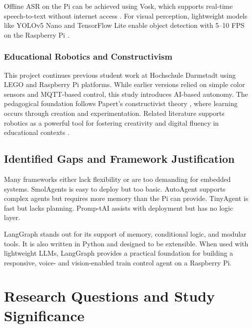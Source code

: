 Offline ASR on the Pi can be achieved using Vosk, which supports real-time speech-to-text without internet access \cite{vosk2023api}. For visual perception, lightweight models like YOLOv5 Nano and TensorFlow Lite enable object detection with 5–10 FPS on the Raspberry Pi \cite{lin2022realtime, tan2023lightweightcv}.


\subsubsection{Educational Robotics and Constructivism}

This project continues previous student work at Hochschule Darmstadt using LEGO and Raspberry Pi platforms. While earlier versions relied on simple color sensors and MQTT-based control, this study introduces AI-based autonomy. The pedagogical foundation follows Papert's constructivist theory \cite{papert1980mindstorms}, where learning occurs through creation and experimentation. Related literature supports robotics as a powerful tool for fostering creativity and digital fluency in educational contexts \cite{resnick2009kindergarten,bers2020coding}.

\subsection{Identified Gaps and Framework Justification}

Many frameworks either lack flexibility or are too demanding for embedded systems. SmolAgents is easy to deploy but too basic. AutoAgent supports complex agents but requires more memory than the Pi can provide. TinyAgent is fast but lacks planning. Promp-tAI assists with deployment but has no logic layer.

LangGraph stands out for its support of memory, conditional logic, and modular tools. It is also written in Python and designed to be extensible. When used with lightweight LLMs, LangGraph provides a practical foundation for building a responsive, voice- and vision-enabled train control agent on a Raspberry Pi.

\section{Research Questions and Study Significance}
\label{sec:background:third_subsection:researchquestions}

